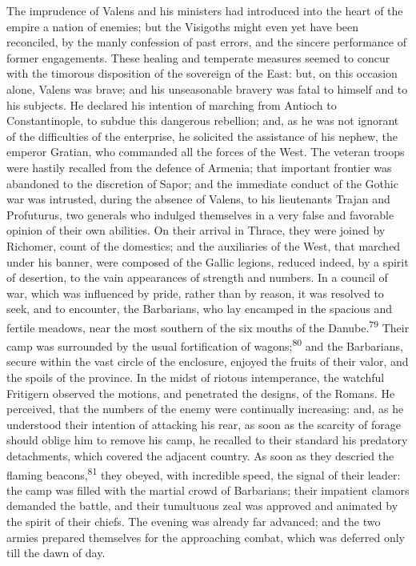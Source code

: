 The imprudence of Valens and his ministers had introduced into
the heart of the empire a nation of enemies; but the Visigoths
might even yet have been reconciled, by the manly confession of
past errors, and the sincere performance of former engagements.
These healing and temperate measures seemed to concur with the
timorous disposition of the sovereign of the East: but, on this
occasion alone, Valens was brave; and his unseasonable bravery
was fatal to himself and to his subjects. He declared his
intention of marching from Antioch to Constantinople, to subdue
this dangerous rebellion; and, as he was not ignorant of the
difficulties of the enterprise, he solicited the assistance of
his nephew, the emperor Gratian, who commanded all the forces of
the West. The veteran troops were hastily recalled from the
defence of Armenia; that important frontier was abandoned to the
discretion of Sapor; and the immediate conduct of the Gothic war
was intrusted, during the absence of Valens, to his lieutenants
Trajan and Profuturus, two generals who indulged themselves in a
very false and favorable opinion of their own abilities. On their
arrival in Thrace, they were joined by Richomer, count of the
domestics; and the auxiliaries of the West, that marched under
his banner, were composed of the Gallic legions, reduced indeed,
by a spirit of desertion, to the vain appearances of strength and
numbers. In a council of war, which was influenced by pride,
rather than by reason, it was resolved to seek, and to encounter,
the Barbarians, who lay encamped in the spacious and fertile
meadows, near the most southern of the six mouths of the Danube.\textsuperscript{79}
Their camp was surrounded by the usual fortification of
wagons;\textsuperscript{80} and the Barbarians, secure within the vast circle of
the enclosure, enjoyed the fruits of their valor, and the spoils
of the province. In the midst of riotous intemperance, the
watchful Fritigern observed the motions, and penetrated the
designs, of the Romans. He perceived, that the numbers of the
enemy were continually increasing: and, as he understood their
intention of attacking his rear, as soon as the scarcity of
forage should oblige him to remove his camp, he recalled to their
standard his predatory detachments, which covered the adjacent
country. As soon as they descried the flaming beacons,\textsuperscript{81} they
obeyed, with incredible speed, the signal of their leader: the
camp was filled with the martial crowd of Barbarians; their
impatient clamors demanded the battle, and their tumultuous zeal
was approved and animated by the spirit of their chiefs. The
evening was already far advanced; and the two armies prepared
themselves for the approaching combat, which was deferred only
till the dawn of day.

